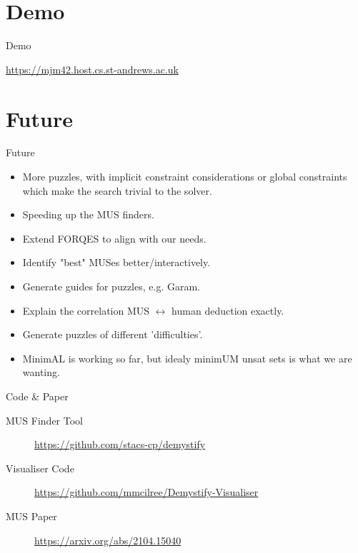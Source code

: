 \documentclass{beamer}
\begin{document}


\section*{Demo}
\begin{frame}{Demo}

\url{https://mjm42.host.cs.st-andrews.ac.uk}

\end{frame}

\section*{Future}
\begin{frame}{Future}
\begin{itemize}
    \item More puzzles, with implicit constraint considerations or global constraints which make the search trivial to the solver.
    \item Speeding up the MUS finders.
    \item Extend FORQES to align with our needs.
    \item Identify "best" MUSes better/interactively.
    \item Generate guides for puzzles, e.g. Garam.
    \item Explain the correlation MUS $\leftrightarrow$ human deduction exactly.
    \item Generate puzzles of different 'difficulties'.
    \item MinimAL is working so far, but idealy minimUM unsat sets is what we are wanting.
\end{itemize}
\end{frame}

\begin{frame}{Code \& Paper}
\begin{description}
    \item[MUS Finder Tool] {\footnotesize{\url{https://github.com/stacs-cp/demystify}}}
    \item[Visualiser Code] {\footnotesize{\url{https://github.com/mmcilree/Demystify-Visualiser}}}
    \item[MUS Paper] {\footnotesize{\url{https://arxiv.org/abs/2104.15040}}}
\end{description}
\end{frame}
\end{document}
